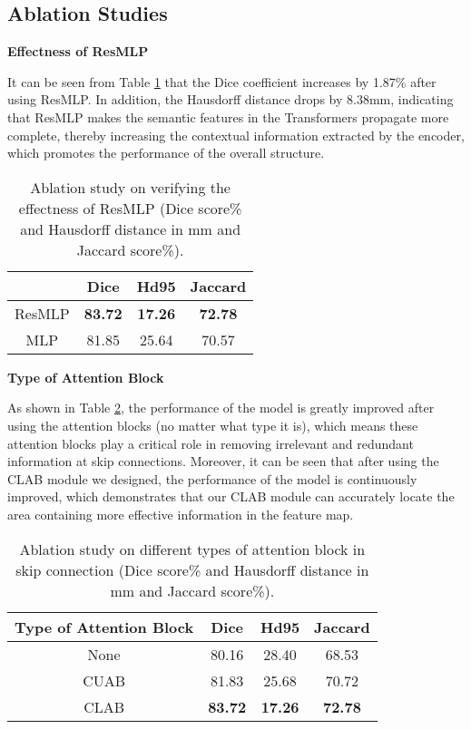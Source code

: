 \documentclass[runningheads]{llncs}
\begin{document}
\subsection{Ablation Studies}
\label{sec4.4}
\noindent\textbf{Effectness of ResMLP}\par
It can be seen from Table \ref{table4} that the Dice coefficient increases by 1.87\% after using ResMLP. In addition, the Hausdorff distance drops by 8.38mm, indicating that ResMLP makes the semantic features in the Transformers propagate more complete, thereby increasing the contextual information extracted by the encoder, which promotes the performance of the overall structure.
\begin{table}[H]\centering
\caption{ Ablation study on verifying the effectness of ResMLP (Dice score\% and Hausdorff distance in mm and Jaccard score\%).}
\label{table4}
\begin{tabular}{c|c|c|c}
\hline
    & Dice           & Hd95           & Jaccard        \\ \hline
ResMLP & \textbf{83.72} & \textbf{17.26} & \textbf{72.78} \\
MLP   & 81.85          & 25.64          & 70.57         \\ \hline
\end{tabular}
\end{table}

\noindent\textbf{Type of Attention Block}\par
As shown in Table \ref{table5}, the performance of the model is greatly improved after using the attention blocks (no matter what type it is), which means these attention blocks play a critical role in removing irrelevant and redundant information at skip connections. Moreover, it can be seen that after using the CLAB module we designed, the performance of the model is continuously improved, which demonstrates that our CLAB module can accurately locate the area containing more effective information in the feature map.
\begin{table}[H]\centering
\caption{Ablation study on different types of attention block in skip connection (Dice score\% and Hausdorff distance in mm and Jaccard score\%).}
\label{table5}
\begin{tabular}{c|c|c|c}
\hline
    Type of Attention Block & Dice           & Hd95           & Jaccard        \\ \hline
    None                    & 80.16          & 28.40          & 68.53          \\
    CUAB\cite{wang2021cuab}                    & 81.83          & 25.68          & 70.72          \\
    CLAB                    & \textbf{83.72} & \textbf{17.26} & \textbf{72.78} \\ \hline
    \end{tabular}
\end{table}
\end{document}
